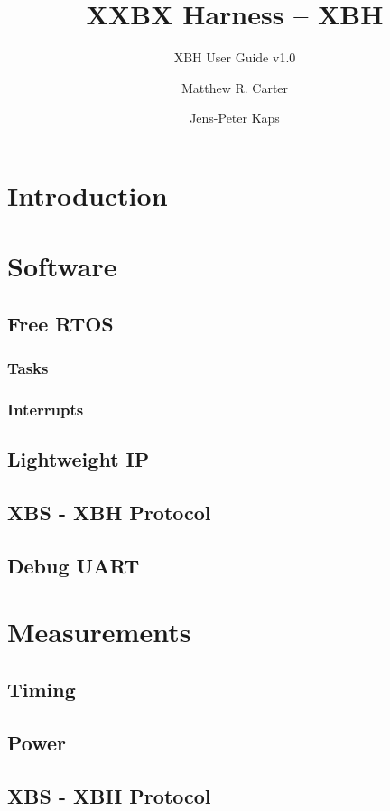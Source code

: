 \documentclass[twoside,11pt]{cergdoc}
\begin{document}
\title{XXBX Harness -- XBH}
\subtitle{XBH User Guide v1.0}
\author{Matthew R. Carter \and Jens-Peter Kaps}

\maketitle

\tableofcontents

\chapter{Introduction}
\chapter{Software}
  \section{Free RTOS}
    \subsection{Tasks}
    \subsection{Interrupts}
  \section{Lightweight IP}
  \section{XBS - XBH Protocol}
  \section{Debug UART}
\chapter{Measurements}
  \section{Timing}
  \section{Power}

\begin{appendix}
\chapter{XBS - XBH Protocol}
\end{appendix}
\end{document}
